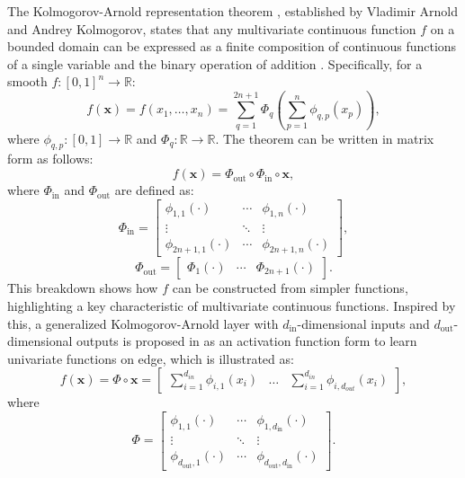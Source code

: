The Kolmogorov-Arnold representation theorem \cite{schmidt2021kolmogorov}, established by Vladimir Arnold and Andrey Kolmogorov, states that any multivariate continuous function $f$ on a bounded domain can be expressed as a finite composition of continuous functions of a single variable and the binary operation of addition \cite{liu2024kan}. Specifically, for a smooth $f: [0,1]^n \to \mathbb{R}$:
\begin{equation}
f(\mathbf{x}) = f(x_1, \ldots, x_n) = \sum_{q=1}^{2n+1} \Phi_q\left(\sum_{p=1}^{n} \phi_{q,p}(x_p)\right),
\end{equation}
where $\phi_{q,p}: [0,1] \to \mathbb{R}$ and $\Phi_q: \mathbb{R} \to \mathbb{R}$. The theorem can be written in matrix form as follows:
\begin{equation}
    f(\mathbf{x}) = \Phi_{\text{out}} \circ \Phi_{\text{in}} \circ \mathbf{x} \label{eq:kan_vector},
\end{equation}
where $\Phi_{\text{in}}$ and $\Phi_{\text{out}}$ are defined as:
\begin{equation}
    \Phi_{\text{in}} = \begin{bmatrix}
\phi_{1,1}(\cdot) & \cdots & \phi_{1,n}(\cdot) \\
\vdots & \ddots & \vdots \\
\phi_{2n+1,1}(\cdot) & \cdots & \phi_{2n+1,n}(\cdot)
\end{bmatrix},
\end{equation}
\begin{equation}
    \Phi_{\text{out}} = \begin{bmatrix}
\Phi_1(\cdot) & \cdots & \Phi_{2n+1}(\cdot)
\end{bmatrix}.
\end{equation}
This breakdown shows how $f$ can be constructed from simpler functions, highlighting a key characteristic of multivariate continuous functions. Inspired by this, a generalized Kolmogorov-Arnold layer with $d_\text{in}$-dimensional inputs and $d_\text{out}$-dimensional outputs is proposed in \cite{yang2024kolmogorov} as an activation function form to learn univariate functions on edge, which is illustrated as:
\begin{equation}
    f(\mathbf{x}) = \Phi \circ \mathbf{x} = \begin{bmatrix}\sum_{i=1}^{d_{in}} \phi_{i,1}(x_i) & \dots& \sum_{i=1}^{d_{in}} \phi_{i,d_{out}}(x_i)\end{bmatrix}, \label{eq:kan_layer}
\end{equation}
where
\begin{equation}
\Phi = \begin{bmatrix}
\phi_{1,1}(\cdot) & \cdots & \phi_{1,d_{\text{in}}}(\cdot) \\
\vdots & \ddots & \vdots \\
\phi_{d_{\text{out}},1}(\cdot) & \cdots & \phi_{d_{\text{out}},d_{\text{in}}}(\cdot)
\end{bmatrix}.
\end{equation}
